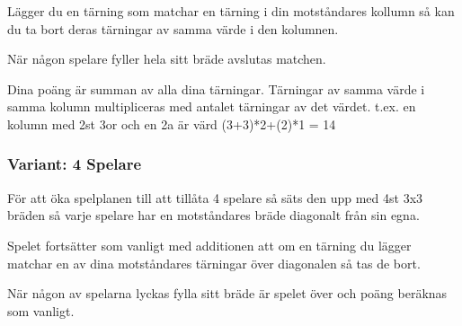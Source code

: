 Lägger du en tärning som matchar en tärning i din motståndares kollumn så kan du ta bort deras tärningar av samma värde i den kolumnen.

När någon spelare fyller hela sitt bräde avslutas matchen.

Dina poäng är summan av alla dina tärningar. Tärningar av samma värde i samma kolumn multipliceras med antalet tärningar av det värdet. t.ex. en kolumn med 2st 3or och en 2a är värd (3+3)*2+(2)*1 = 14

\subsubsection*{Variant: 4 Spelare}

För att öka spelplanen till att tillåta 4 spelare så säts den upp med 4st 3x3 bräden så varje spelare har en motståndares bräde diagonalt från sin egna.

Spelet fortsätter som vanligt med additionen att om en tärning du lägger matchar en av dina motståndares tärningar över diagonalen så tas de bort. 

När någon av spelarna lyckas fylla sitt bräde är spelet över och poäng beräknas som vanligt.

\newpage